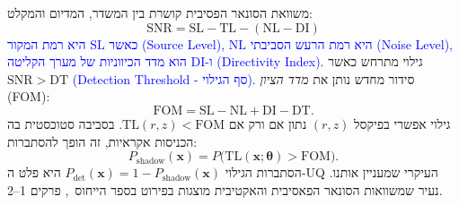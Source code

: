 \documentclass[12pt,a4paper]{article}
\newcommand{\TL}{\mathrm{TL}}
\newcommand{\Pshadow}{P_{\mathrm{shadow}}}
\DeclareRobustCommand{\aiedit}[1]{\textcolor{blue}{#1}}
\begin{document}
משוואת הסונאר הפסיבית קושרת בין המשדר, המדיום והמקלט:
\begin{equation}
  \mathrm{SNR} = \mathrm{SL} - \TL - (\mathrm{NL} - \mathrm{DI})
\end{equation}
\aiedit{כאשר $\mathrm{SL}$ היא רמת המקור (\textenglish{Source Level}), $\mathrm{NL}$ היא רמת
הרעש הסביבתי (\textenglish{Noise Level}), ו-$\mathrm{DI}$ הוא מדד הכיווניות של מערך הקליטה
(\textenglish{Directivity Index}).}
גילוי מתרחש כאשר $\mathrm{SNR} > \mathrm{DT}$ \aiedit{(\textenglish{Detection Threshold} - סף הגילוי)}.
סידור מחדש נותן את \emph{מדד הציון} (\textenglish{FOM}):
\begin{equation}
  \mathrm{FOM} = \mathrm{SL} - \mathrm{NL} + \mathrm{DI} - \mathrm{DT}.
\end{equation}
גילוי אפשרי בפיקסל $(r,z)$ נתון אם ורק אם $\TL(r,z) < \mathrm{FOM}$.
בסביבה סטוכסטית בה הכניסות אקראיות, זה הופך להסתברות:
\begin{equation}
  \Pshadow(\mathbf{x}) = P\!\bigl(\TL(\mathbf{x};\boldsymbol{\theta}) > \mathrm{FOM}\bigr).
\end{equation}
הסתברות הגילוי $P_\mathrm{det}(\mathbf{x}) = 1 - \Pshadow(\mathbf{x})$ היא פלט ה-\textenglish{UQ} העיקרי שמעניין אותנו.
נעיר שמשוואות הסונאר הפאסיבית והאקטיבית מוצגות בפירוט בספר הייחוס~\cite{jensen2011coac},
פרקים 1--2.

\end{document}
